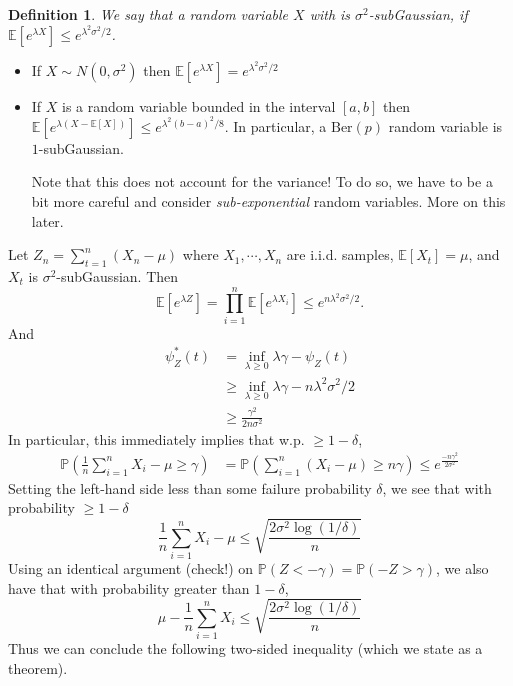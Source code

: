 \documentclass[11pt]{article}
\newtheorem{definition}{Definition}
\renewcommand{\P}{\mathbb{P}}
\newcommand{\E}{\mathbb{E}}
\newcommand{\1}{\mathbf{1}}
\begin{document}
\begin{definition}
    We say that a random variable $X$ with is $\sigma^2$-subGaussian, if $\E[e^{\lambda X}] \leq e^{\lambda^2\sigma^2/2}$.
\end{definition} 
\begin{itemize}
    \item If $X\sim N(0,\sigma^2)$ then $\E[e^{\lambda X}] = e^{\lambda^2\sigma^2/2}$
    \item If $X$ is a random variable bounded in the interval $[a,b]$ then $\E[e^{\lambda (X-\E[X])}] \leq  e^{\lambda^2(b-a)^2/8}$. In particular, a $\text{Ber}(p)$ random variable is $1$-subGaussian.
    
    Note that this does not account for the variance! To do so, we have to be a bit more careful and consider \textit{sub-exponential} random variables. More on this later.
\end{itemize}


Let $Z_n = \sum_{t=1}^{n} (X_n - \mu)$ where $X_1,\cdots, X_n$ are i.i.d. samples, $\E[X_t] = \mu$, and $X_t$ is $\sigma^{2}$-subGaussian. Then 
\[\E[e^{\lambda Z}] = \prod_{i=1}^n \E[e^{\lambda X_i}] \leq e^{n\lambda^2\sigma^2/2}.\]
And 
\begin{align*}
    \psi_Z^{\ast}(t) 
    &= \inf_{\lambda \geq 0} \lambda \gamma - \psi_Z(t)\\
    &\geq  \inf_{\lambda \geq 0} \lambda \gamma - n\lambda^2\sigma^2/2\tag{Set $\lambda= \gamma/n\sigma^2$}\\
    &\geq \frac{\gamma^2}{2n\sigma^2}
\end{align*}
In particular, this immediately implies that w.p. $\geq 1-\delta$, 
\begin{align*}
\P(\frac{1}{n}\sum_{i=1}^n X_i - \mu \geq \gamma)
&= \P(\sum_{i=1}^n (X_i - \mu) \geq n\gamma)
\leq e^{\frac{-n\gamma^2}{2\sigma^2}}
\end{align*}
Setting the left-hand side less than some failure probability $\delta$, we see that with probability $\geq 1-\delta$
\[\frac{1}{n}\sum_{i=1}^n X_i - \mu \leq \sqrt{\frac{2\sigma^2\log(1/\delta)}{n}}\]
Using an identical argument (check!) on $\P(Z < -\gamma) = \P(-Z > \gamma)$, we also have that with probability greater than $1-\delta$, 
\[\mu - \frac{1}{n}\sum_{i=1}^n X_i \leq \sqrt{\frac{2\sigma^2\log(1/\delta)}{n}}\]
Thus we can conclude the following two-sided inequality (which we state as a theorem).
\end{document}
